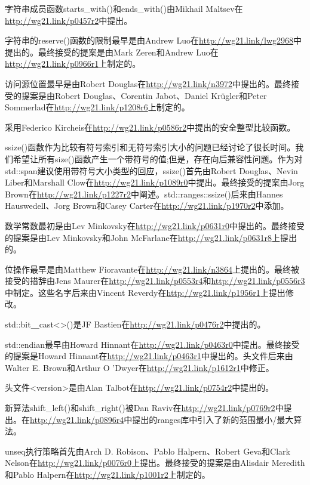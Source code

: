 字符串成员函数starts\_with()和ends\_with()由Mikhail Maltsev在\url{http://wg21.link/p0457r2}中提出。

字符串的reserve()函数的限制最早是由Andrew Luo在\url{http://wg21.link/lwg2968}中提出的。最终接受的提案是由Mark Zeren和Andrew Luo在\url{http://wg21.link/p0966r1}上制定的。

访问源位置最早是由Robert Douglas在\url{http://wg21.link/n3972}中提出的。最终接受的提案是由Robert Douglas、Corentin Jabot、Daniel Kr{\"u}gler和Peter Sommerlad在\url{http://wg21.link/p1208r6}上制定的。

采用Federico Kircheis在\url{http://wg21.link/p0586r2}中提出的安全整型比较函数。

ssize()函数作为比较有符号索引和无符号索引大小的问题已经讨论了很长时间。我们希望让所有size()函数产生一个带符号的值;但是，存在向后兼容性问题。作为对std::span建议使用带符号大小类型的回应，ssize()首先由Robert Douglas、Nevin Liber和Marshall Clow在\url{http://wg21.link/p1089r0}中提出。最终接受的提案由Jorg Brown在\url{http://wg21.link/p1227r2}中阐述。std::ranges::ssize()后来由Hannes Hauswedell、Jorg Brown和Casey Carter在\url{http://wg21.link/p1970r2}中添加。

数学常数最初是由Lev Minkovsky在\url{http://wg21.link/p0631r0}中提出的。最终接受的提案是由Lev Minkovsky和John McFarlane在\url{http://wg21.link/p0631r8}上提出的。

位操作最早是由Matthew Fioravante在\url{http://wg21.link/n3864}上提出的。最终被接受的措辞由Jens Maurer在\url{http://wg21.link/p0553r4}和\url{http://wg21.link/p0556r3}中制定。这些名字后来由Vincent Reverdy在\url{http://wg21.link/p1956r1}上提出修改。

std::bit＿cast<>()是JF Bastien在\url{http://wg21.link/p0476r2}中提出的。

std::endian最早由Howard Hinnant在\url{http://wg21.link/p0463r0}中提出。最终接受的提案是Howard Hinnant在\url{http://wg21.link/p0463r1}中提出的。头文件后来由Walter E. Brown和Arthur O 'Dwyer在\url{http://wg21.link/p1612r1}中修正。

头文件<version>是由Alan Talbot在\url{http://wg21.link/p0754r2}中提出的。

新算法shift\_left()和shift\_right()被Dan Raviv在\url{http://wg21.link/p0769r2}中提出。在\url{http://wg21.link/p0896r4}中提出的ranges库中引入了新的范围最小/最大算法。

unseq执行策略首先由Arch D. Robison、Pablo Halpern、Robert Geva和Clark Nelson在\url{http://wg21.link/p0076r0}上提出。最终接受的提案是由Alisdair Meredith和Pablo Halpern在\url{http://wg21.link/p1001r2}上制定的。
